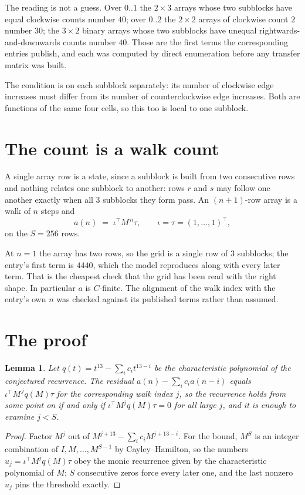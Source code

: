 \documentclass[11pt,a4paper]{article}
\theoremstyle{plain}
\newtheorem{lemma}[theorem]{Lemma}
\theoremstyle{definition}
\begin{document}
The reading is not a guess. Over $0..1$ the $2\times3$ arrays whose two subblocks have equal
clockwise counts number $40$; over $0..2$ the $2\times2$ arrays of clockwise count $2$ number
$30$; the $3\times2$ binary arrays whose two subblocks have unequal rightwards-and-downwards
counts number $40$. Those are the first terms the corresponding entries publish, and each was
computed by direct enumeration before any transfer matrix was built.

The condition is on each subblock separately: its number of clockwise edge increases must differ from its number
of counterclockwise edge increases. Both are functions of the same four cells, so this too is local to one
subblock.

\section{The count is a walk count}

A single array row is a state, since a subblock is built from two
consecutive rows and nothing relates one subblock to another: rows $r$ and $s$ may follow one
another exactly when all $3$ subblocks they form pass. An $(n+1)$-row array is a walk of $n$
steps and
\[
a(n)\;=\;\iota^{\!\top}M^{\,n}\tau,\qquad\iota=\tau=(1,\dots,1)^{\!\top},
\]
on the $S=256$ rows.

At $n=1$ the array has two rows, so the grid is a single row of $3$
subblocks; the entry's first term is $4440$, which the model
reproduces along with every later term. That is the cheapest check that the grid has been read
with the right shape.
In particular $a$ is $C$-finite. The alignment of the walk index with the entry's own $n$ was
checked against its published terms rather than assumed.

\section{The proof}

\begin{lemma}\label{lem:crit}
Let $q(t)=t^{13}-\sum_i c_it^{13-i}$ be the characteristic polynomial of the
conjectured recurrence. The residual $a(n)-\sum_ic_ia(n-i)$ equals
$\iota^{\!\top}M^{\,j}q(M)\tau$ for the corresponding walk index $j$, so the recurrence
holds from some point on if and only if $\iota^{\!\top}M^{j}q(M)\tau=0$ for all large $j$,
and it is enough to examine $j<S$.
\end{lemma}

\begin{proof}
Factor $M^{j}$ out of $M^{j+13}-\sum_ic_iM^{j+13-i}$. For the bound, $M^{S}$
is an integer combination of $I,M,\dots,M^{S-1}$ by Cayley--Hamilton, so the numbers
$u_j=\iota^{\!\top}M^{j}q(M)\tau$ obey the monic recurrence given by the characteristic
polynomial of $M$; $S$ consecutive zeros force every later one, and the last nonzero $u_j$
pins the threshold exactly.
\end{proof}
\end{document}
